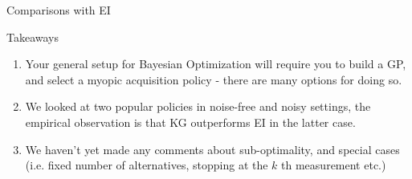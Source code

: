 \documentclass[usenames,dvipsnames]{beamer}
\theoremstyle{definition}
\let\oldcite=\cite
\renewcommand{\cite}[2][]{\textcolor{blue}{\oldcite[#1]{#2}}}
\begin{document}
\begin{frame}{Comparisons with EI}
    
\end{frame}

\begin{frame}{Takeaways}
\begin{enumerate}
    \item Your general setup for Bayesian Optimization will require you to build a GP, and select a myopic acquisition policy - there are many options for doing so.
    
    \item We looked at two popular policies in noise-free and noisy settings, the empirical observation is that KG outperforms EI in the latter case.
    
    \item We haven't yet made any comments about sub-optimality, and special cases (i.e. fixed number of alternatives, stopping at the $k$ th measurement etc.)
\end{enumerate}

\end{frame}





\end{document}
